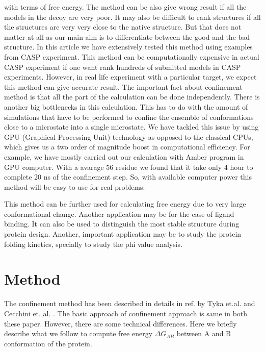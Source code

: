 \documentclass[12pt]{article}
\begin{document}
with terms of free energy. 
The method can be also give wrong result if all the models in the decoy are very poor. It may also be difficult to rank structures if 
all the structures are very very close to the native structure. But that does not matter at all as our main aim is to differentiate
between the good and the bad structure. In this article we have extensively tested this method using examples from CASP experiment.
This method can be computationally expensive in actual CASP experiment if one want rank hundreds of submitted models in CASP 
experiments. However, in real life experiment with a particular target, we expect this method can give accurate result. The important 
fact about confinement method is that all the part of the calculation can be done independently. 
There is another big bottlenecks in this calculation. This has to do with the amount of
simulations that have to be performed to confine the ensemble of conformations close to a microstate
into a single microstate. We have tackled this issue by using GPU (Graphical Processing Unit) technology as opposed to the classical
CPUs, which gives us a two order of magnitude boost in computational efficiency.
For example, we have mostly carried out our calculation with Amber program \cite{Case2005} in GPU computer. With a avarage 56 residue 
we found that it take only 4 hour to complete 20 ns of the confinement step. So, with available computer power this method will 
be easy to use for real problems. 
 
This method can be further used for calculating free energy due to very large conformational change. Another application may be
for the case of ligand binding. It can also be used to distinguish the most stable structure during protein design. Another, important
application may be to study the protein folding kinetics, specially to study the phi value analysis.            


\section{Method}

The confinement method has been described in details in ref. by Tyka et.al. \cite{Tyka2006} and 
Cecchini et. al. \cite{Cecchini2009}. The basic approach of confinement approach is same in both
these paper. However, there are some technical differences. Here we briefly describe what we follow
to compute free energy $\Delta G_{AB}$ between A and B
conformation of the protein.
\end{document}
